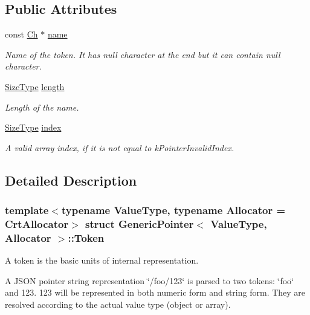 \subsection*{Public Attributes}
\begin{DoxyCompactItemize}
\item 
const \hyperlink{classGenericPointer_ab292356c11b4015c98d21b966b11f285}{Ch} $\ast$ \hyperlink{structGenericPointer_1_1Token_a8aa9b13bd66addb0c0512cfcae72174c}{name}
\begin{DoxyCompactList}\small\item\em Name of the token. It has null character at the end but it can contain null character. \end{DoxyCompactList}\item 
\hyperlink{rapidjson_8h_a5ed6e6e67250fadbd041127e6386dcb5}{Size\+Type} \hyperlink{structGenericPointer_1_1Token_a67383574032a3289d34002bb2d95df6d}{length}
\begin{DoxyCompactList}\small\item\em Length of the name. \end{DoxyCompactList}\item 
\hyperlink{rapidjson_8h_a5ed6e6e67250fadbd041127e6386dcb5}{Size\+Type} \hyperlink{structGenericPointer_1_1Token_a0ce571cfe3f3da942a5912bb2cd24dcf}{index}
\begin{DoxyCompactList}\small\item\em A valid array index, if it is not equal to k\+Pointer\+Invalid\+Index. \end{DoxyCompactList}\end{DoxyCompactItemize}


\subsection{Detailed Description}
\subsubsection*{template$<$typename Value\+Type, typename Allocator = Crt\+Allocator$>$\newline
struct Generic\+Pointer$<$ Value\+Type, Allocator $>$\+::\+Token}

A token is the basic units of internal representation. 

A J\+S\+ON pointer string representation \char`\"{}/foo/123\char`\"{} is parsed to two tokens\+: \char`\"{}foo\char`\"{} and 123. 123 will be represented in both numeric form and string form. They are resolved according to the actual value type (object or array).

